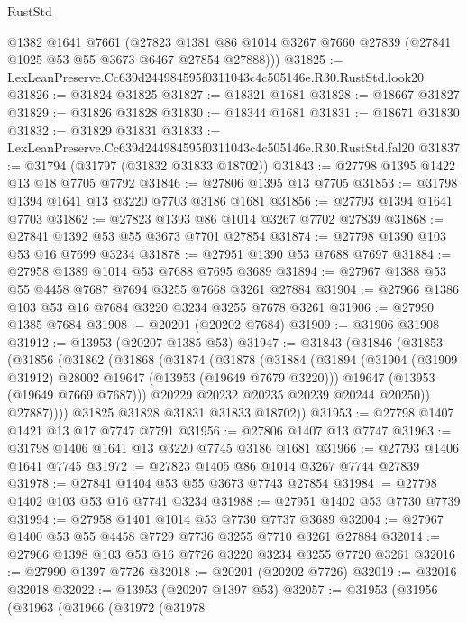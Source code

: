\begin{lexlean}{RustStd}
\begin{coremodule}
      @1382
      @1641
      @7661
      (@27823 @1381 @86 @1014 @3267 @7660 @27839 (@27841 @1025 @53 @55 @3673 @6467 @27854 @27888)))
@31825 := LexLeanPreserve.Cc639d244984595f0311043c4c505146e.R30.RustStd.look20
@31826 := @31824 @31825
@31827 := @18321 @1681
@31828 := @18667 @31827
@31829 := @31826 @31828
@31830 := @18344 @1681
@31831 := @18671 @31830
@31832 := @31829 @31831
@31833 := LexLeanPreserve.Cc639d244984595f0311043c4c505146e.R30.RustStd.fal20
@31837 := @31794 (@31797 (@31832 @31833 @18702))
@31843 := @27798 @1395 @1422 @13 @18 @7705 @7792
@31846 := @27806 @1395 @13 @7705
@31853 := @31798 @1394 @1641 @13 @3220 @7703 @3186 @1681
@31856 := @27793 @1394 @1641 @7703
@31862 := @27823 @1393 @86 @1014 @3267 @7702 @27839
@31868 := @27841 @1392 @53 @55 @3673 @7701 @27854
@31874 := @27798 @1390 @103 @53 @16 @7699 @3234
@31878 := @27951 @1390 @53 @7688 @7697
@31884 := @27958 @1389 @1014 @53 @7688 @7695 @3689
@31894 := @27967 @1388 @53 @55 @4458 @7687 @7694 @3255 @7668 @3261 @27884
@31904 := @27966 @1386 @103 @53 @16 @7684 @3220 @3234 @3255 @7678 @3261
@31906 := @27990 @1385 @7684
@31908 := @20201 (@20202 @7684)
@31909 := @31906 @31908
@31912 := @13953 (@20207 @1385 @53)
@31947 := @31843
    (@31846
      (@31853
        (@31856
          (@31862
            (@31868
              (@31874
                (@31878
                  (@31884
                    (@31894
                      (@31904 (@31909 @31912) @28002 @19647 (@13953 (@19649 @7679 @3220)))
                      @19647
                      (@13953 (@19649 @7669 @7687)))
                    @20229
                    @20232
                    @20235
                    @20239
                    @20244
                    @20250))
                @27887))))
        @31825
        @31828
        @31831
        @31833
        @18702))
@31953 := @27798 @1407 @1421 @13 @17 @7747 @7791
@31956 := @27806 @1407 @13 @7747
@31963 := @31798 @1406 @1641 @13 @3220 @7745 @3186 @1681
@31966 := @27793 @1406 @1641 @7745
@31972 := @27823 @1405 @86 @1014 @3267 @7744 @27839
@31978 := @27841 @1404 @53 @55 @3673 @7743 @27854
@31984 := @27798 @1402 @103 @53 @16 @7741 @3234
@31988 := @27951 @1402 @53 @7730 @7739
@31994 := @27958 @1401 @1014 @53 @7730 @7737 @3689
@32004 := @27967 @1400 @53 @55 @4458 @7729 @7736 @3255 @7710 @3261 @27884
@32014 := @27966 @1398 @103 @53 @16 @7726 @3220 @3234 @3255 @7720 @3261
@32016 := @27990 @1397 @7726
@32018 := @20201 (@20202 @7726)
@32019 := @32016 @32018
@32022 := @13953 (@20207 @1397 @53)
@32057 := @31953
    (@31956
      (@31963
        (@31966
          (@31972
            (@31978

\end{coremodule}
\end{lexlean}
